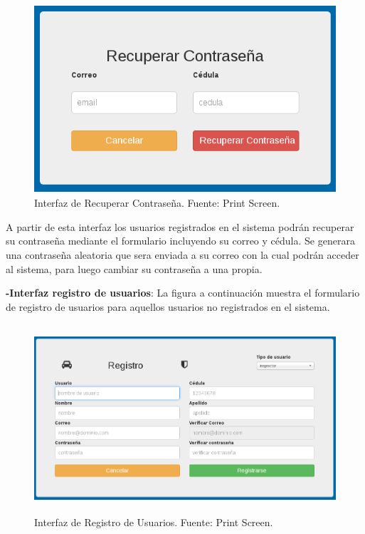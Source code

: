 \begin{figure}[H]
\begin{center}
	\includegraphics[width=14cm,height=7cm]{img/interfaces/recuperar_contrasena.png}
\end{center}
\caption{Interfaz de Recuperar Contraseña. Fuente: Print Screen.}
\label{fig:interfaz_recuperar_contrasena}
\end{figure}

A partir de esta interfaz los usuarios registrados en el sistema podrán recuperar su contraseña mediante el formulario incluyendo su correo y cédula. Se generara una contraseña aleatoria que sera enviada a su correo con la cual podrán acceder al sistema, para luego cambiar su contraseña a una propia.


\textbf{-Interfaz registro de usuarios}: La figura a continuación muestra el formulario de registro de usuarios para aquellos usuarios no registrados en el sistema.

\begin{figure}[H]
\begin{center}
	\includegraphics[width=14cm,height=7cm]{img/interfaces/registro_usuario.png}
\end{center}
\caption{Interfaz de Registro de Usuarios. Fuente: Print Screen.}
\label{fig:interfaz_registro_usuario}
\end{figure}

